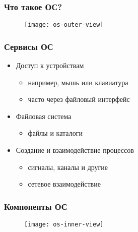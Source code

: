 \begin{frame}
\frametitle{Что такое ОС?}
\begin{figure}
    \hspace*{\fill}
    \texttt{[image: os-outer-view]}
    \hspace*{\fill}\hspace*{\fill}
\end{figure}
\end{frame}

\begin{frame}
\frametitle{Сервисы ОС}
\begin{itemize}
    \item<1-> Доступ к устройствам
    \begin{itemize}
        \item например, мышь или клавиатура
        \item часто через файловый интерфейс
    \end{itemize}
    \item<2-> Файловая система
    \begin{itemize}
        \item файлы и каталоги
    \end{itemize}
    \item<3-> Создание и взаимодействие процессов
    \begin{itemize}
        \item сигналы, каналы и другие
        \item сетевое взаимодействие
    \end{itemize}
\end{itemize}
\end{frame}

\begin{frame}
\frametitle{Компоненты ОС}
\begin{figure}
    \hspace*{\fill}
    \texttt{[image: os-inner-view]}
    \hspace*{\fill}\hspace*{\fill}
\end{figure}
\end{frame}

